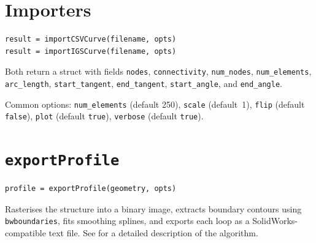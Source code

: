 \section{Importers}
\label{sec:api:importers}

\begin{lstlisting}
result = importCSVCurve(filename, opts)
result = importIGSCurve(filename, opts)
\end{lstlisting}

Both return a struct with fields \texttt{nodes}, \texttt{connectivity},
\texttt{num\_nodes}, \texttt{num\_elements}, \texttt{arc\_length},
\texttt{start\_tangent}, \texttt{end\_tangent}, \texttt{start\_angle}, and
\texttt{end\_angle}.

Common options: \texttt{num\_elements} (default 250), \texttt{scale}
(default~1), \texttt{flip} (default \texttt{false}), \texttt{plot} (default
\texttt{true}), \texttt{verbose} (default \texttt{true}).

\section{\texttt{exportProfile}}
\label{sec:api:export}

\begin{lstlisting}
profile = exportProfile(geometry, opts)
\end{lstlisting}

Rasterises the structure into a binary image, extracts boundary contours
using \texttt{bwboundaries}, fits smoothing splines, and exports each loop
as a SolidWorks-compatible text file.  See  for a detailed
description of the algorithm.

